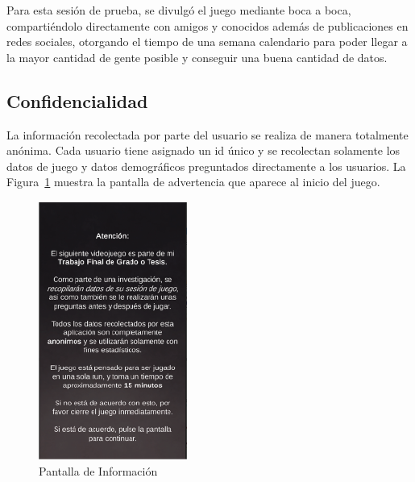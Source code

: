 Para esta sesión de prueba, se divulgó el juego mediante boca a boca, compartiéndolo directamente con amigos y conocidos además de publicaciones en redes sociales, otorgando el tiempo de una semana calendario para poder llegar a la mayor cantidad de gente posible y conseguir una buena cantidad de datos.

\subsection{Confidencialidad}
La información recolectada por parte del usuario se realiza de manera totalmente anónima. Cada usuario tiene asignado un id único y se recolectan solamente los datos de juego y datos demográficos preguntados directamente a los usuarios. La Figura~\ref{fig:advertencia} muestra la pantalla de advertencia que aparece al inicio del juego.

\begin{figure}[h]
    \centering
    \includegraphics[scale=1.1]{imgs/advertencia.png}
    \caption{Pantalla de Información}
    \label{fig:advertencia}
\end{figure}


